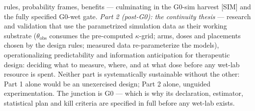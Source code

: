 \documentclass[10pt,twocolumn]{article}
\begin{document}
rules, probability frames, benefits --- culminating in the G0-sim harvest [SIM] and the fully specified G0-wet gate. \emph{Part 2 (post-G0): the continuity thesis} --- research and validation that use the parametrized simulation data as their working substrate ($\theta_{\text{obs}}$ consumes the pre-computed $\kappa$-grid; arms, doses and placements chosen by the design rules; measured data re-parameterize the models), operationalizing predictability and information anticipation for therapeutic design: deciding what to measure, where, and at what dose before any wet-lab resource is spent. Neither part is systematically sustainable without the other: Part 1 alone would be an unexercised design; Part 2 alone, unguided experimentation. The junction is G0 --- which is why its declaration, estimator, statistical plan and kill criteria are specified in full before any wet-lab exists.
\end{document}
